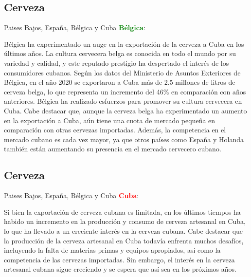\subsection{Cerveza}
\begin{frame}[fragile]{Paises Bajos, España, Bélgica y Cuba}
  \textbf{\textcolor{green}{Bélgica}}:

  Bélgica ha experimentado un auge en la exportación de la cerveza a Cuba en los últimos años. La cultura cervecera belga es conocida en todo el mundo por su variedad y calidad, y este reputado prestigio ha despertado el interés de los consumidores cubanos. 
  Según los datos del Ministerio de Asuntos Exteriores de Bélgica, en el año 2020 se exportaron a Cuba más de 2.5 millones de litros de cerveza belga, lo que representa un incremento del 46\% en comparación con años anteriores. 
  Bélgica ha realizado esfuerzos para promover su cultura cervecera en Cuba. 
  Cabe destacar que, aunque la cerveza belga ha experimentado un aumento en la exportación a Cuba, aún tiene una cuota de mercado pequeña en comparación con otras cervezas importadas. 
  Además, la competencia en el mercado cubano es cada vez mayor, ya que otros países como España y Holanda también están aumentando su presencia en el mercado cervecero cubano.
  
\end{frame}

\subsection{Cerveza}
\begin{frame}[fragile]{Paises Bajos, España, Bélgica y Cuba}
  \textbf{\textcolor{red}{Cuba}}:

  Si bien la exportación de cerveza cubana es limitada, en los últimos tiempos ha habido un incremento en la producción y consumo de cerveza artesanal en Cuba, lo que ha llevado a un creciente interés en la cerveza cubana. 
  Cabe destacar que la producción de la cerveza artesanal en Cuba todavía enfrenta muchos desafíos, incluyendo la falta de materias primas y equipos apropiados, así como la competencia de las cervezas importadas. 
  Sin embargo, el interés en la cerveza artesanal cubana sigue creciendo y se espera que así sea en los próximos años.
\end{frame}

